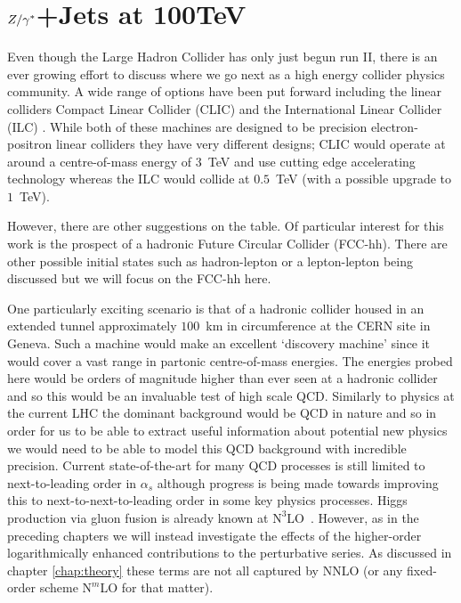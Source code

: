 
\chapter{$Z/\gamma^*$+Jets at 100TeV}
\label{chap:100TeV}

	Even though the Large Hadron Collider has only just begun run II, there is an ever growing effort to discuss
	where we go next as a high energy collider physics community.  A wide range of options have been put forward
	including the linear colliders Compact Linear Collider (CLIC) \cite{Abramowicz:2013tzc} and the International
	Linear Collider (ILC) \cite{BrauJames:2007aa}.  While both of these machines are designed to be precision
	electron-positron linear colliders they have very different designs; CLIC would operate at around a
	centre-of-mass energy of $3$~TeV and use cutting edge accelerating technology whereas the ILC would collide
	at $0.5$~TeV (with a possible upgrade to $1$~TeV).

	However, there are other suggestions on the table.  Of particular interest for this work is the prospect
	of a hadronic Future Circular Collider (FCC-hh).  There are other possible initial states such as
	hadron-lepton or a lepton-lepton being discussed but we will focus on the FCC-hh here.

	One particularly exciting scenario is that of a \htev hadronic collider housed in an extended tunnel
	approximately $100$~km in circumference at the CERN site in Geneva.  Such a machine would make an
	excellent `discovery machine' since it would cover a vast range in partonic centre-of-mass energies.
	The energies probed here would be orders of magnitude higher than ever seen at a hadronic collider
	and so this would be an invaluable test of high scale QCD.  Similarly to physics at the current LHC
	the dominant background would be QCD in nature and so in order for us to be able to extract useful
	information about potential new physics we would need to be able to model this QCD background with
	incredible precision.  Current state-of-the-art for many QCD processes is still limited to next-to-leading
	order in $\alpha_s$ although progress is being made towards improving this to next-to-next-to-leading
	order in some key physics processes.  Higgs production via gluon fusion is already known at
	$\text{N}^3$LO~\cite{Anastasiou:2015ema}. However, as in the preceding chapters we will instead
	investigate the effects of the higher-order logarithmically enhanced contributions to the perturbative
	series.  As discussed in chapter \ref{chap:theory} these terms are not all captured by NNLO (or any
	fixed-order scheme $\text{N}^m$LO for that matter).

